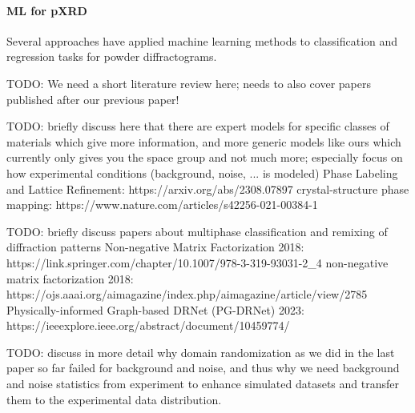 \paragraph{ML for pXRD} Several approaches have applied machine learning methods to classification and regression tasks for powder diffractograms.

TODO: We need a short literature review here; needs to also cover papers published after our previous paper!

TODO: briefly discuss here that there are expert models for specific classes of materials which give more information, and more generic models like ours which currently only gives you the space group and not much more; especially focus on how experimental conditions (background, noise, ... is modeled)
Phase Labeling and Lattice Refinement: https://arxiv.org/abs/2308.07897
crystal-structure phase mapping: https://www.nature.com/articles/s42256-021-00384-1


TODO: briefly discuss papers about multiphase classification and remixing of diffraction patterns
Non-negative Matrix Factorization 2018: https://link.springer.com/chapter/10.1007/978-3-319-93031-2_4
non-negative matrix factorization 2018: https://ojs.aaai.org/aimagazine/index.php/aimagazine/article/view/2785
Physically-informed Graph-based DRNet (PG-DRNet) 2023: https://ieeexplore.ieee.org/abstract/document/10459774/

TODO: discuss in more detail why domain randomization as we did in the last paper so far failed for background and noise, and thus why we need background and noise statistics from experiment to enhance simulated datasets and transfer them to the experimental data distribution.